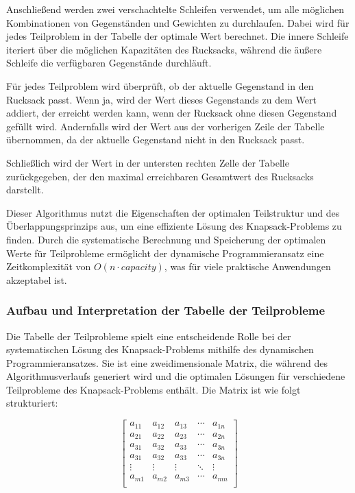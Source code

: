 Anschließend werden zwei verschachtelte Schleifen verwendet, um alle möglichen Kombinationen von Gegenständen und Gewichten
zu durchlaufen. Dabei wird für jedes Teilproblem in der Tabelle der optimale Wert berechnet. Die innere Schleife iteriert
über die möglichen Kapazitäten des Rucksacks, während die äußere Schleife die verfügbaren Gegenstände durchläuft.

Für jedes Teilproblem wird überprüft, ob der aktuelle Gegenstand in den Rucksack passt. Wenn ja, wird der Wert dieses
Gegenstands zu dem Wert addiert, der erreicht werden kann, wenn der Rucksack ohne diesen Gegenstand gefüllt wird. Andernfalls
wird der Wert aus der vorherigen Zeile der Tabelle übernommen, da der aktuelle Gegenstand nicht in den Rucksack passt.

Schließlich wird der Wert in der untersten rechten Zelle der Tabelle zurückgegeben, der den maximal erreichbaren Gesamtwert
des Rucksacks darstellt.

Dieser Algorithmus nutzt die Eigenschaften der optimalen Teilstruktur und des Überlappungsprinzips aus, um eine effiziente
Lösung des Knapsack-Problems zu finden. Durch die systematische Berechnung und Speicherung der optimalen Werte für Teilprobleme
ermöglicht der dynamische Programmieransatz eine Zeitkomplexität von \( O(n \cdot capacity) \), was für viele praktische
Anwendungen akzeptabel ist.

\subsubsection*{Aufbau und Interpretation der Tabelle der Teilprobleme}
Die Tabelle der Teilprobleme spielt eine entscheidende Rolle bei der systematischen Lösung des Knapsack-Problems mithilfe
des dynamischen Programmieransatzes. Sie ist eine zweidimensionale Matrix, die während des Algorithmusverlaufs generiert
wird und die optimalen Lösungen für verschiedene Teilprobleme des Knapsack-Problems enthält. Die Matrix ist wie folgt strukturiert:

\[
\left[
\begin{array}{ccccc}
a_{11} & a_{12} & a_{13} & \cdots & a_{1n} \\
a_{21} & a_{22} & a_{23} & \cdots & a_{2n} \\
a_{31} & a_{32} & a_{33} & \cdots & a_{3n} \\
a_{31} & a_{32} & a_{33} & \cdots & a_{3n} \\
\vdots & \vdots & \vdots & \ddots & \vdots \\
a_{m1} & a_{m2} & a_{m3} & \cdots & a_{mn} \\
\end{array}
\right]
\]


